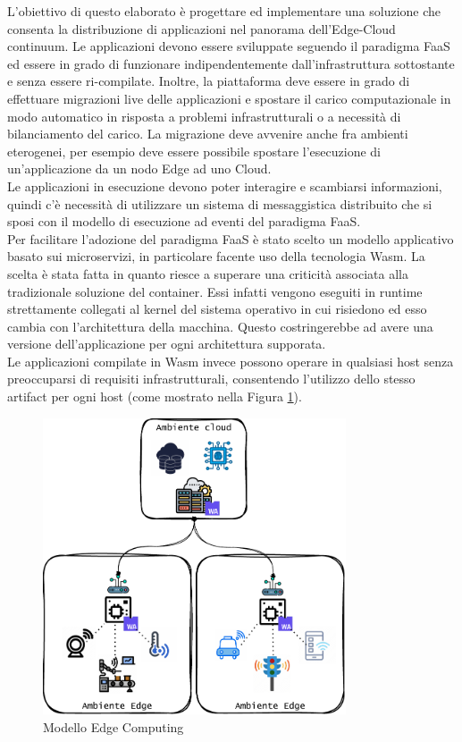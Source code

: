 
L'obiettivo di questo elaborato è progettare ed implementare una soluzione che consenta la distribuzione di applicazioni nel panorama dell'Edge-Cloud continuum. Le applicazioni devono essere sviluppate seguendo il paradigma FaaS ed essere in grado di funzionare indipendentemente dall'infrastruttura sottostante e senza essere ri-compilate. Inoltre, la piattaforma deve essere in grado di effettuare migrazioni live delle applicazioni e spostare il carico computazionale in modo automatico in risposta a problemi infrastrutturali o a necessità di bilanciamento del carico. La migrazione deve avvenire anche fra ambienti eterogenei, per esempio deve essere possibile spostare l'esecuzione di un'applicazione da un nodo Edge ad uno Cloud.\\
Le applicazioni in esecuzione devono poter interagire e scambiarsi informazioni, quindi c'è necessità di utilizzare un sistema di messaggistica distribuito che si sposi con il modello di esecuzione ad eventi del paradigma FaaS.\\

Per facilitare l'adozione del paradigma FaaS è stato scelto un modello applicativo basato sui microservizi\cite{Aksakalli2021Deployment}, in particolare facente uso della tecnologia Wasm. La scelta è stata fatta in quanto riesce a superare una criticità associata alla tradizionale soluzione del container. Essi infatti vengono eseguiti in runtime strettamente collegati al kernel del sistema operativo in cui risiedono ed esso cambia con l'architettura della macchina. Questo costringerebbe ad avere una versione dell'applicazione per ogni architettura supporata.\\
Le applicazioni compilate in Wasm invece possono operare in qualsiasi host senza preoccuparsi di requisiti 
infrastrutturali, consentendo l'utilizzo dello stesso artifact per ogni host (come mostrato nella Figura \ref{fig:modello_edge_computing}).\\

\FloatBarrier
\begin{figure}[h]
    \centering
    \includegraphics[width=0.8\textwidth]{img/schemi/schemi-Scenari.drawio.pdf}
    \caption{Modello Edge Computing}
    \label{fig:modello_edge_computing}
\end{figure}
\FloatBarrier

